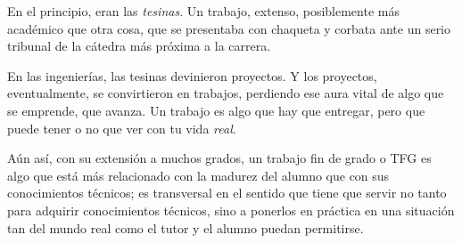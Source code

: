 
En el principio, eran las {\em tesinas}. Un trabajo, extenso, posiblemente más académico que otra cosa, que se presentaba con chaqueta y corbata ante un serio tribunal de la cátedra más próxima a la carrera.

En las ingenierías, las tesinas devinieron proyectos. Y los proyectos, eventualmente, se convirtieron en trabajos, perdiendo ese aura vital de algo que se emprende, que avanza. Un trabajo es algo que hay que entregar, pero que puede tener o no que ver con tu vida {\em real}.

Aún así, con su extensión a muchos grados, un trabajo fin de grado o TFG es algo que está más relacionado con la madurez del alumno que con sus conocimientos técnicos; es transversal en el sentido que tiene que servir no tanto para adquirir conocimientos técnicos, sino a ponerlos en práctica en una situación tan del mundo real como el tutor y el alumno puedan permitirse. 
